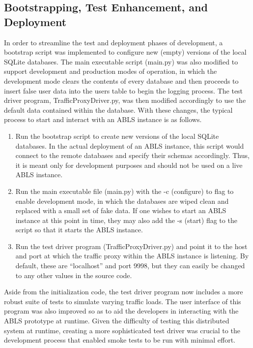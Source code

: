 \documentclass{sig-alternate}
\begin{document}
\subsection{Bootstrapping, Test Enhancement, and Deployment}
In order to streamline the test and deployment phases of development, a bootstrap script was implemented to configure
new (empty) versions of the local SQLite databases. The main executable script (main.py) was also modified to support
development and production modes of operation, in which the development mode clears the contents of every 
database and then proceeds to insert false user data into the users table to begin the logging process. The test 
driver program, TrafficProxyDriver.py, was then modified accordingly to use the default data contained within the 
database. With these changes, the typical process to start and interact with an ABLS instance is as follows.

\begin{enumerate}
	\item Run the bootstrap script to create new versions of the local SQLite databases. In the actual deployment of an ABLS instance, this script would connect to the remote databases and specify their schemas accordingly. Thus, it is meant only for development purposes and should not be used on a live ABLS instance.
	\item Run the main executable file (main.py) with the -c (configure) to flag to enable development mode, in which the databases are wiped clean and replaced with a small set of fake data. If one wishes to start an ABLS instance at this point in time, they may also add the -s (start) flag to the script so that it starts the ABLS instance.
	\item Run the test driver program (TrafficProxyDriver.py) and point it to the host and port at which the traffic proxy within the ABLS instance is listening. By default, these are ``localhost'' and port 9998, but they can easily be changed to any other values in the source code. 
\end{enumerate}

Aside from the initialization code, the test driver program now includes a more robust suite of tests to simulate varying traffic 
loads. The user interface of this program was also improved so as to aid the developers in interacting with the ABLS 
prototype at runtime. Given the difficulty of testing this distributed system at runtime, creating a more sophisticated
test driver was crucial to the development process that enabled smoke tests to be run with minimal effort.
\end{document}
